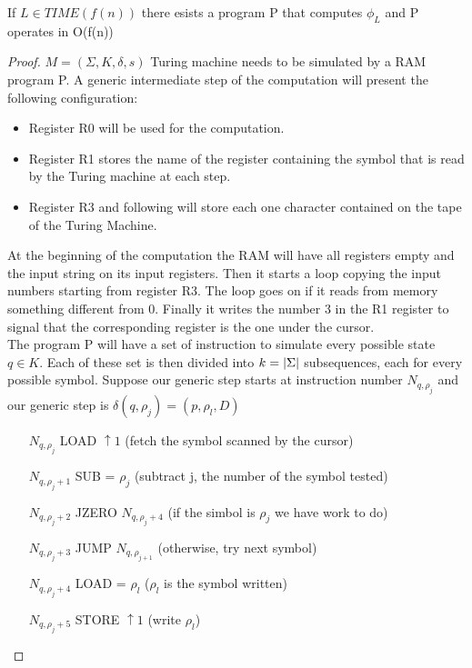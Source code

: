 \begin{theorem}
    If $L \in TIME(f(n))$ there esists a program P that computes $\phi_L$ and P operates in O(f(n))
    \begin{proof}
        $M = (\Sigma, K, \delta, s)$ Turing machine needs to be simulated by a RAM program P. A generic intermediate step of the computation will present the following configuration:
        \begin{itemize}
            \item Register R0 will be used for the computation.
            \item Register R1 stores the name of the register containing the symbol that is read by the Turing machine at each step.
            \item Register R3 and following will store each one character contained on the tape of the Turing Machine.
        \end{itemize}
        At the beginning of the computation the RAM will have all registers empty and the input string on its input registers. Then it starts a loop copying the input numbers starting from register R3. The loop goes on if it reads from memory something different from 0. Finally it writes the number 3 in the R1 register to signal that the corresponding register is the one under the cursor.\\The program P will have a set of instruction to simulate every possible state $q \in K$. Each of these set is then divided into $k = \left\lvert\Sigma\right\rvert$ subsequences, each for every possible symbol. Suppose our generic step starts at instruction number $N_{q,\rho_j}$ and our generic step is $\delta(q,\rho_j) = (p,\rho_l,D)$\\
        \begin{enumerate}
            \item[$N_{q,\rho_j}$] LOAD $\uparrow 1$ \quad (fetch the symbol scanned by the cursor)
            \item[$N_{q,\rho_j+1}$] SUB = $\rho_j$ \quad (subtract j, the number of the symbol tested)
            \item[$N_{q,\rho_j+2}$] JZERO $N_{q,\rho_j+4}$ \quad (if the simbol is $\rho_j$ we have work to do)
            \item[$N_{q,\rho_j+3}$] JUMP $N_{q,\rho_{j+1}}$ \quad (otherwise, try next symbol)
            \item[$N_{q,\rho_j+4}$] LOAD = $\rho_l$ \quad ($\rho_l$ is the symbol written)
            \item[$N_{q,\rho_j+5}$] STORE $\uparrow 1$ \quad (write $\rho_l$)

\end{enumerate}
\end{proof}
\end{theorem}
